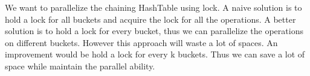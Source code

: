 \documentclass[twoside]{article}
\begin{document}
We want to parallelize the chaining HashTable using lock. A naive solution is to hold a lock for all buckets and acquire the lock for all the operations. A better solution is to hold a lock for every bucket, thus we can parallelize the operations on different buckets. However this approach will waste a lot of spaces. An improvement would be hold a lock for every k buckets. Thus we can save a lot of space while maintain the parallel ability.
\end{document}
